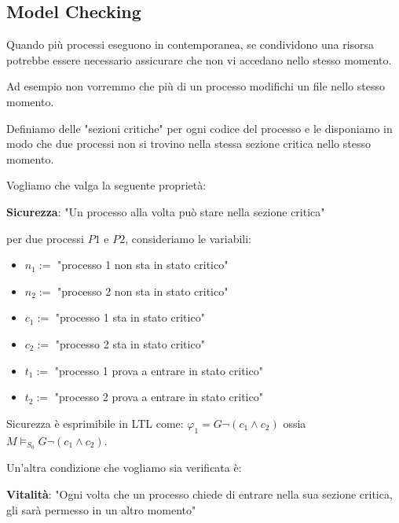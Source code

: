 \documentclass[../main.tex]{subfiles}
\begin{document}
\subsection{Model Checking}
\begin{example}
    Quando più processi eseguono in contemporanea, se condividono una risorsa potrebbe essere necessario assicurare che non vi accedano nello stesso momento.

    Ad esempio non vorremmo che più di un processo modifichi un file nello stesso momento.

    Definiamo delle "sezioni critiche" per ogni codice del processo e le disponiamo in modo che due processi non si trovino nella stessa sezione critica nello stesso momento.

    Vogliamo che valga la seguente proprietà:

    \textbf{Sicurezza}: "Un processo alla volta può stare nella sezione critica"

    per due processi $P1$ e $P2$, consideriamo le variabili:
    \begin{itemize}
        \item $n_1 := $ "processo 1 non sta in stato critico"
        \item $n_2 := $ "processo 2 non sta in stato critico"
        \item $c_1 := $ "processo 1 sta in stato critico"
        \item $c_2 := $ "processo 2 sta in stato critico"
        \item $t_1 := $ "processo 1 prova a entrare in stato critico"
        \item $t_2 := $ "processo 2 prova a entrare in stato critico"
    \end{itemize}

    Sicurezza è esprimibile in LTL come: $\varphi_1 = G\neg (c_1 \land c_2)$ ossia $M \vDash_{S_0} G\neg (c_1 \land c_2)$.

    Un'altra condizione che vogliamo sia verificata è:

    \textbf{Vitalità}: "Ogni volta che un processo chiede di entrare nella sua sezione critica, gli sarà permesso in un altro momento"


\end{example}
\end{document}

